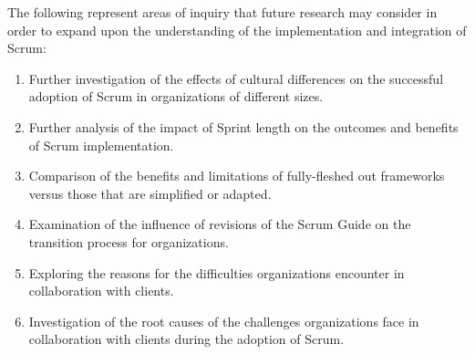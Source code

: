The following represent areas of inquiry that future research may consider in order to expand upon the understanding of the implementation and integration of Scrum:

\begin{enumerate}
    \item Further investigation of the effects of cultural differences on the successful \gls{adoption} of Scrum in organizations of different sizes.
    \item Further analysis of the impact of Sprint length on the outcomes and benefits of Scrum implementation.
    \item Comparison of the benefits and limitations of fully-fleshed out \glspl{framework} versus those that are simplified or adapted.
    \item Examination of the influence of revisions of the Scrum Guide on the \gls{transition} process for organizations.
    \item Exploring the reasons for the difficulties organizations encounter in collaboration with \glspl{client}.
    \item Investigation of the root causes of the challenges organizations face in collaboration with \glspl{client} during the \gls{adoption} of Scrum.
\end{enumerate}